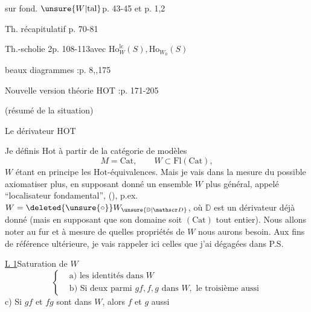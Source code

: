  sur  fond. $\unsure{W|\mathrm{tal}}$\qquad p. 43-45 et p. 1,2

Th. récapitulatif \qquad p. 70-81

Th.-scholie 2\qquad p. 108-113\qquad avec $\mathrm{Ho}_W^{\mathrm{lc}}(S),\mathrm{Ho}_{W_0}(S)$

beaux diagrammes :\qquad p. 8,,175

Nouvelle version théorie HOT :\qquad p. 171-205

(résumé de la situation)

Le dérivateur HOT

Je définis $\mathrm{Hot}$ à partir de la catégorie de
modèles
\[
M=\mathrm{Cat},\qquad W\subset\mathrm{Fl}(\mathrm{Cat}),
\]
$W$ étant en principe les $\mathrm{Hot}$-équivalences. Mais je
vais dans la mesure du possible axiomatiser plus,
en supposant donné un ensemble $W$ plus
général, appelé ``localisateur fondamental'',
(), p.ex. $W=\deleted{\unsure{\circ}}W_{\unsure{\mathbb D|\mathscr D}}$, où $\mathbb D$ est un
dérivateur déjà donné (mais en supposant que
son domaine soit $(\mathrm{Cat})$ tout entier). Nous
allons noter au fur et à mesure de quelles
propriétés de $W$ nous aurons besoin. Aux fins de
référence ultérieure, je vais rappeler ici celles que
j'ai dégagées dans P.S.

\uline{L 1}\quad Saturation de $W$ 
\[
\left\{\begin{aligned}
&\text{a) les identités dans }W\\
&\text{b) Si deux parmi }gf,f,g\text{ dans }W,\text{ le troisième aussi}
\end{aligned}\right.
\]
c) Si $gf$ et $fg$ sont dans $W$, alors $f$ et $g$ aussi

